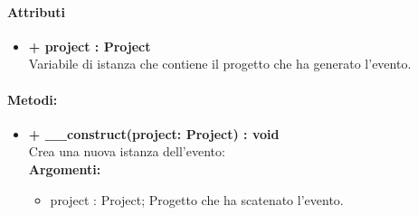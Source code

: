 \paragraph{Attributi}
\begin{itemize}
	\item \textbf{+ project : Project}\\
	Variabile di istanza che contiene il progetto che ha generato l'evento.   
\end{itemize}

\paragraph{Metodi:}
\begin{itemize}
	\item \textbf{+ \_\_construct(project: Project) : void}\\
	Crea una nuova istanza dell'evento:\\
	\textbf{Argomenti:}
	\begin{itemize}
		\item project : Project;
		Progetto che ha scatenato l'evento.
	\end{itemize}
\end{itemize}